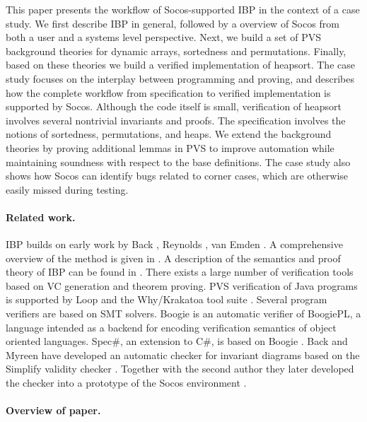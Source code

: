 \documentclass[english,submission]{eptcs}
\begin{document}
This paper presents the workflow of Socos-supported IBP in the context
of a case study. We first describe IBP in general, followed by a overview
of Socos from both a user and a systems level perspective. Next, we
build a set of PVS background theories for dynamic arrays, sortedness
and permutations. Finally, based on these theories we build a verified
implementation of heapsort. The case study focuses on the interplay
between programming and proving, and describes how the complete workflow
from specification to verified implementation is supported by Socos.
Although the code itself is small, verification of heapsort involves
several nontrivial invariants and proofs. The specification involves
the notions of sortedness, permutations, and heaps. We extend the
background theories by proving additional lemmas in PVS to improve
automation while maintaining soundness with respect to the base definitions.
The case study also shows how Socos can identify bugs related to corner
cases, which are otherwise easily missed during testing.


\paragraph{Related work.}

IBP builds on early work by Back \cite{Back78:situation}, Reynolds
\cite{Reynolds78}, van Emden \cite{vEmden79}. A comprehensive overview
of the method is given in \cite{jBack08b}. A description of the semantics
and proof theory of IBP can be found in \cite{back_preoteasa11proofrules}.
There exists a large number of verification tools based on VC generation
and theorem proving. PVS verification of Java programs is supported
by Loop \cite{vandenberg01loop} and the Why/Krakatoa tool suite \cite{citeulike:2868751}.
Several program verifiers are based on SMT solvers. Boogie \cite{barnett_boogie:modular_2006}
is an automatic verifier of BoogiePL, a language intended as a backend
for encoding verification semantics of object oriented languages.
Spec\#, an extension to C\#, is based on Boogie \cite{specSharpOverview}.
Back and Myreen have developed an automatic checker for invariant
diagrams \cite{inpBaMy05a} based on the Simplify validity checker
\cite{1066102}. Together with the second author they later developed
the checker into a prototype of the Socos environment \cite{inpBaErMy07}. 


\paragraph{Overview of paper.}
\end{document}

